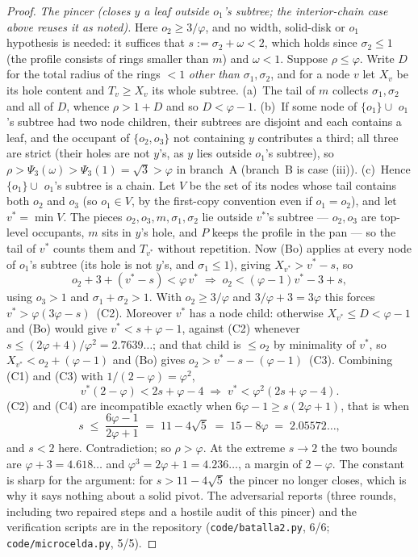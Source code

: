 \documentclass[11pt]{article}
\theoremstyle{definition}
\begin{document}
\begin{proof}
\emph{The pincer (closes $y$ a leaf outside $o_1$'s subtree; the
interior-chain case above reuses it as noted).} Here
$o_2\ge3/\varphi$, and no width, solid-disk or $o_1$ hypothesis is
needed: it suffices that $s:=\sigma_2+\omega<2$, which holds since
$\sigma_2\le1$ (the profile consists of rings smaller than $m$) and
$\omega<1$. Suppose $\rho\le\varphi$. Write $D$ for the total radius of
the rings $<1$ \emph{other than} $\sigma_1,\sigma_2$, and for a node $v$
let $X_v$ be its hole content and $T_v\ge X_v$ its whole subtree.
(a)~The tail of $m$ collects $\sigma_1,\sigma_2$ and all of $D$, whence
$\rho>1+D$ and so $D<\varphi-1$. (b)~If some node of $\{o_1\}\cup$
$o_1$'s subtree had two node children, their subtrees are disjoint and
each contains a leaf, and the occupant of $\{o_2,o_3\}$ not containing
$y$ contributes a third; all three are strict (their holes are not
$y$'s, as $y$ lies outside $o_1$'s subtree), so
$\rho>\Psi_3(\omega)>\Psi_3(1)=\sqrt3>\varphi$ in branch~A
(branch~B is case (iii)). (c)~Hence $\{o_1\}\cup$ $o_1$'s subtree is a
chain. Let $V$ be the set of its nodes whose tail contains both $o_2$
and $o_3$ (so $o_1\in V$, by the first-copy convention even if
$o_1=o_2$), and let $v^{*}=\min V$. The pieces $o_2,o_3,m,\sigma_1,
\sigma_2$ lie outside $v^{*}$'s subtree --- $o_2,o_3$ are top-level
occupants, $m$ sits in $y$'s hole, and $P$ keeps the profile in the pan
--- so the tail of $v^{*}$ counts them and $T_{v^{*}}$ without
repetition. Now (Bo) applies at every node of $o_1$'s subtree (its hole
is not $y$'s, and $\sigma_1\le1$), giving $X_{v^{*}}>v^{*}-s$, so
\[
o_2+3+(v^{*}-s)<\varphi\,v^{*}
\;\Longrightarrow\;
o_2<(\varphi-1)v^{*}-3+s,
\tag{C1}
\]
using $o_3>1$ and $\sigma_1+\sigma_2>1$. With $o_2\ge3/\varphi$ and
$3/\varphi+3=3\varphi$ this forces $v^{*}>\varphi(3\varphi-s)$~(C2).
Moreover $v^{*}$ has a node child: otherwise $X_{v^{*}}\le D<\varphi-1$
and (Bo) would give $v^{*}<s+\varphi-1$, against (C2) whenever
$s\le(2\varphi+4)/\varphi^2=2.7639\dots$; and that child is $\le o_2$ by
minimality of $v^{*}$, so $X_{v^{*}}<o_2+(\varphi-1)$ and (Bo) gives
$o_2>v^{*}-s-(\varphi-1)$~(C3). Combining (C1) and (C3) with
$1/(2-\varphi)=\varphi^2$,
\[
v^{*}(2-\varphi)<2s+\varphi-4
\;\Longrightarrow\;
v^{*}<\varphi^{2}(2s+\varphi-4).
\tag{C4}
\]
(C2) and (C4) are incompatible exactly when
$6\varphi-1\ge s(2\varphi+1)$, that is when
\[
s\;\le\;\frac{6\varphi-1}{2\varphi+1}\;=\;11-4\sqrt5\;=\;15-8\varphi
\;=\;2.05572\dots,
\]
and $s<2$ here. Contradiction; so $\rho>\varphi$. At the extreme $s\to2$
the two bounds are $\varphi+3=4.618\dots$ and
$\varphi^3=2\varphi+1=4.236\dots$, a margin of $2-\varphi$. The
constant is sharp for the argument: for $s>11-4\sqrt5$ the pincer no
longer closes, which is why it says nothing about a solid pivot.
The adversarial reports (three rounds, including two repaired steps and
a hostile audit of this pincer) and the verification scripts are in the
repository (\texttt{code/batalla2.py}, 6/6;
\texttt{code/microcelda.py}, 5/5).
\end{proof}
\end{document}
